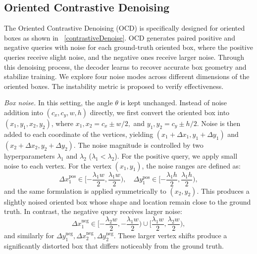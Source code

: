 \documentclass[lettersize,journal]{IEEEtran}
\begin{document}
\subsection{Oriented Contrastive Denoising}\label{sec:denoising}

The Oriented Contrastive Denoising (OCD) is specifically designed for oriented boxes as shown in \figurename~\ref{contrastiveDenoise}. OCD generates paired positive and negative queries with noise for each ground-truth oriented box, where the positive queries receive slight noise, and the negative ones receive larger noise. Through this denoising process, the decoder learns to recover accurate box geometry and stabilize training. We explore four noise modes across different dimensions of the oriented boxes. The instability metric is proposed to verify effectiveness.





\textit{Box noise.}
In this setting, the angle $\theta$ is kept unchanged. Instead of noise addition into $(c_x,c_y,w,h)$ directly, we first convert the oriented box into $(x_1,y_1,x_2,y_2)$, where $x_1,x_2 = c_x \pm w/2,$ and $ y_1,y_2 = c_y \pm h/2$. Noise is then added to each coordinate of the vertices, yielding $(x_1+\Delta x_1,y_1+\Delta y_1)$ and $(x_2+\Delta x_2,y_2+\Delta y_2)$. The noise magnitude is controlled by two hyperparameters $\lambda_1$ and $\lambda_2$ ($\lambda_1 < \lambda_2$). For the positive query, we apply small noise to each vertex. For the vertex $(x_1,y_1)$, the noise ranges are defined as:
\begin{equation}
  \Delta x_{1}^{\text{pos}} \in [-\frac{\lambda_1 w}{2},\frac{\lambda_1 w}{2}), \quad
  \Delta y_{1}^{\text{pos}} \in [-\frac{\lambda_1 h}{2},\frac{\lambda_1 h}{2}),
\end{equation}
and the same formulation is applied symmetrically to $(x_2,y_2)$. This produces a slightly noised oriented box whose shape and location remain close to the ground truth. In contrast, the negative query receives larger noise:
\begin{equation}
  \Delta x_{1}^{\text{neg}} \in 
  [-\frac{\lambda_2 w}{2}, -\frac{\lambda_1 w}{2}) \cup
  [\frac{\lambda_1 w}{2}, \frac{\lambda_2 w}{2}),
\end{equation}
and similarly for $\Delta y_{1}^{\text{neg}}, \Delta x_{2}^{\text{neg}}, \Delta y_{2}^{\text{neg}}$. These larger vertex shifts produce a significantly distorted box that differs noticeably from the ground truth.


\instability
\end{document}
